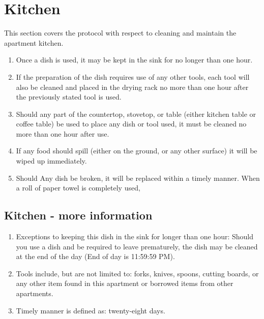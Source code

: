\documentclass[10pt]{article}
\begin{document}
\section{Kitchen}
This section covers the protocol with respect to cleaning and maintain the apartment kitchen.
\begin{enumerate}
	\item Once a dish is used, it may be kept in the sink for no longer than one hour.
	\item If the preparation of the dish requires use of any other tools, each tool will also be cleaned and placed in the drying rack no more than one hour after the previously stated tool is used.
	\item Should any part of the countertop, stovetop, or table (either kitchen table or coffee table) be used to place any dish or tool used, it must be cleaned no more than one hour after use.
	\item If any food should spill (either on the ground, or any other surface) it will be wiped up immediately.
	\item Should Any dish be broken, it will be replaced within a timely manner.
	When a roll of paper towel is completely used,

\end{enumerate}
\subsection{Kitchen - more information}
\begin{enumerate}
	\item Exceptions to keeping this dish in the sink for longer than one hour: Should you use a dish and be required to leave prematurely, the dish may be cleaned at the end of the day (End of day is 11:59:59 PM).
	\item Tools include, but are not limited to: forks, knives, spoons, cutting boards, or any other item found in this apartment or borrowed items from other apartments.
	\item Timely manner is defined as: twenty-eight days.

\end{enumerate}
\end{document}
